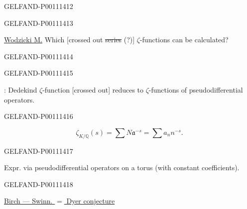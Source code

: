 \begin{GelfandAdjacentEvidence}{GELFAND-P001114}{12}

\end{GelfandAdjacentEvidence}
\begin{GelfandAdjacentEvidence}{GELFAND-P001114}{13}


\underline{Wodzicki M.} Which [crossed out \sout{series} (?)] $\zeta$-functions can be calculated?
\end{GelfandAdjacentEvidence}
\begin{GelfandAdjacentEvidence}{GELFAND-P001114}{14}

\end{GelfandAdjacentEvidence}
\begin{GelfandAdjacentEvidence}{GELFAND-P001114}{15}


: Dedekind $\zeta$-function [crossed out] reduces to $\zeta$-functions of pseudodifferential operators.
\end{GelfandAdjacentEvidence}
\begin{GelfandAdjacentEvidence}{GELFAND-P001114}{16}

\[
\zeta_{K/\mathbb Q}(s)=\sum N\mathfrak a^{-s}=\sum a_n n^{-s}.
\]
\end{GelfandAdjacentEvidence}
\begin{GelfandAdjacentEvidence}{GELFAND-P001114}{17}

Expr. via pseudodifferential operators on a torus (with constant coefficients).

\end{GelfandAdjacentEvidence}
\begin{GelfandAdjacentEvidence}{GELFAND-P001114}{18}


\quad \underline{Birch — Swinn. $=$ Dyer conjecture}

\end{GelfandAdjacentEvidence}
